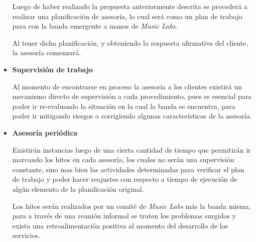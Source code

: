 \begin{itemize}
		Luego de haber realizado la propuesta anteriormente descrita
		se procederá a realizar una planificación de asesoría,
		lo cual será como un plan de trabajo para con la banda emergente
		a manos de \emph{Music Labs}.

		Al tener dicha planificación, y obteniendo la respuesta afirmativa
		del cliente, la asesoría comenzará.

	\item \textbf{Supervisión de trabajo}

		Al momento de encontrarse en proceso la asesoría a los clientes
		existirá un mecanismo directo de supervisión a cada procedimiento,
		pues es esencial para poder ir re-evaluando la situación en la
		cual la banda se encuentra, para poder ir mitigando riesgos
		o corrigiendo algunas características de la asesoría.
	\item \textbf{Asesoría periódica}

		Existirán instancias luego de una cierta cantidad de tiempo
		que permitirán ir marcando los hitos en cada asesoría,
		los cuales no serán una supervisión constante, sino mas
		bien las actividades determinadas para verificar el plan
		de trabajo y poder hacer reajustes con respecto a tiempo
		de ejecución de algún elemento de la planificación
		original.

		Los hitos serán realizados por un comité de \emph{Music Labs}
		más la banda misma, para a través de una reunión informal
		se traten los problemas surgidos y exista una retroalimentación
		positiva al momento del desarrollo de los servicios.


\end{itemize}
\newpage
